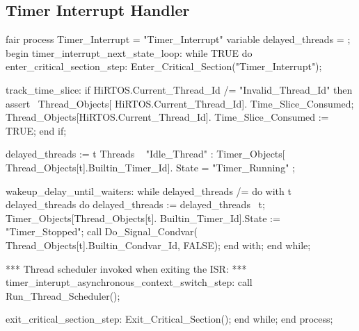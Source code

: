\documentclass[sigplan,anonymous,10pt]{acmart}
\begin{document}
\subsection{Timer Interrupt Handler}
\begin{ppcal}
fair process Timer_Interrupt = "Timer_Interrupt"
   variable delayed_threads = {};
begin
   timer_interrupt_next_state_loop:
   while TRUE do
      enter_critical_section_step:
      Enter_Critical_Section("Timer_Interrupt");

      track_time_slice:
      if HiRTOS.Current_Thread_Id /= "Invalid_Thread_Id" 
      then
         assert ~Thread_Objects[
                    HiRTOS.Current_Thread_Id].
                       Time_Slice_Consumed;
         Thread_Objects[HiRTOS.Current_Thread_Id].
            Time_Slice_Consumed := TRUE;
      end if;

      delayed_threads :=
         { t \in Threads \ { "Idle_Thread" } :
           Timer_Objects[
              Thread_Objects[t].Builtin_Timer_Id].
                 State = "Timer_Running" };

      wakeup_delay_until_waiters:
      while delayed_threads /= {} do
         with t \in delayed_threads do
            delayed_threads := delayed_threads \ {t};
            Timer_Objects[Thread_Objects[t].
               Builtin_Timer_Id].State := "Timer_Stopped";
            call Do_Signal_Condvar(
                   Thread_Objects[t].Builtin_Condvar_Id,
                   FALSE);
          end with;
      end while;

      \* *** Thread scheduler invoked when exiting the ISR: ***
      timer_interupt_asynchronous_context_switch_step:
      call Run_Thread_Scheduler();

      exit_critical_section_step:
      Exit_Critical_Section();
   end while;
end process;
\end{ppcal}
\end{document}
